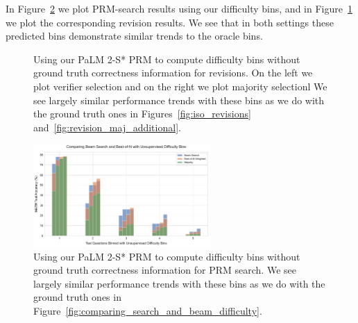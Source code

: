 \documentclass[11pt, letterpaper, logo]{googledeepmind}
\begin{document}
In Figure~\ref{fig:search_unsupervised_difficulty} we plot PRM-search results using our difficulty bins, and in Figure~\ref{fig:revisions_unsupervised_difficulty} we plot the corresponding revision results. We see that in both settings these predicted bins demonstrate similar trends to the oracle bins.

\begin{figure}
    \centering
    \hfill
    \caption{Using our PaLM 2-S* PRM to compute difficulty bins without ground truth correctness information for revisions. On the left we plot verifier selection and on the right we plot majority selectionl We see largely similar performance trends with these bins as we do with the ground truth ones in Figures~\ref{fig:iso_revisions} and~\ref{fig:revision_maj_additional}.}
    \label{fig:revisions_unsupervised_difficulty}
\end{figure}

\begin{figure}
    \centering
    \includegraphics[width=0.6\textwidth]{figures/search_unsup_difficulty_output.pdf}
    \caption{Using our PaLM 2-S* PRM to compute difficulty bins without ground truth correctness information for PRM search. We see largely similar performance trends with these bins as we do with the ground truth ones in Figure~\ref{fig:comparing_search_and_beam_difficulty}.}
    \label{fig:search_unsupervised_difficulty}
\end{figure}
\end{document}
